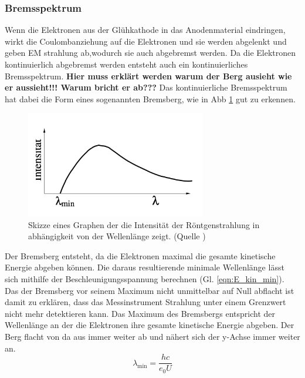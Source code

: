 \subsubsection{Bremsspektrum}
Wenn die Elektronen aus der Glühkathode in das Anodenmaterial eindringen, wirkt die Coulombanziehung auf die Elektronen und sie werden abgelenkt und geben EM strahlung ab,wodurch sie auch abgebremst werden.
Da die Elektronen kontinuierlich abgebremst werden entsteht auch ein kontinuierliches Bremsspektrum.
\textbf{Hier muss erklärt werden warum der Berg ausieht wie er aussieht!!!
        Warum bricht er ab???}
Das kontinuierliche Bremsspektrum hat dabei die Form eines sogenannten Bremsberg, wie in Abb \ref{fig:Bremsspektrum} gut zu erkennen.
\begin{figure}
    \centering
    \includegraphics[width=0.7\textwidth]{bilder/Bremsspektrum.png}
    \caption{Skizze eines Graphen der die Intensität der Röntgenstrahlung in abhängigkeit von der Wellenlänge zeigt. (Quelle \cite{Anleitung})}
    \label{fig:Bremsspektrum}
\end{figure}
Der Bremsberg entsteht, da die Elektronen maximal die gesamte kinetische Energie abgeben können.
Die daraus resultierende minimale Wellenlänge lässt sich mithilfe der Beschleunigungsspannung berechnen (Gl. \ref{eqn:E_kin_min}).
Das der Bremsberg vor seinem Maximum nicht unmittelbar auf Null abflacht ist damit zu erklären, dass das Messinstrument Strahlung unter einem Grenzwert nicht mehr detektieren kann.
Das Maximum des Bremsbergs entspricht der Wellenlänge an der die Elektronen ihre gesamte kinetische Energie abgeben. Der Berg flacht von da aus immer weiter ab und nähert sich der y-Achse immer weiter an.
\begin{equation}
    \lambda_{\text{min}} = \frac{hc}{e_0 U} \label{eqn:E_kin_min}
\end{equation}
